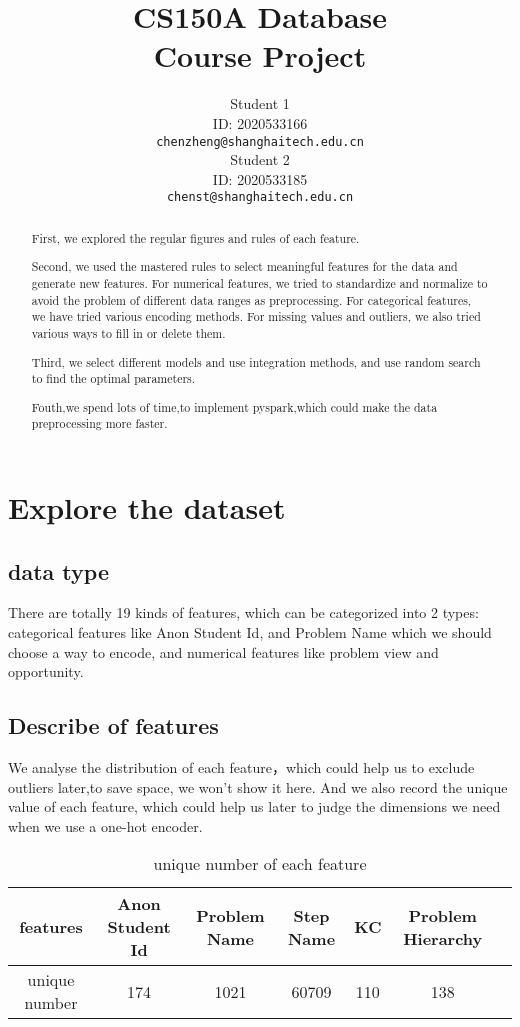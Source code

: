 \documentclass{article}
\title{CS150A Database \\Course Project}
\author{
	Student 1\\
	ID: 2020533166\\
	\texttt{chenzheng@shanghaitech.edu.cn} \\
	\And
	Student 2\\
	ID: 2020533185\\
	\texttt{chenst@shanghaitech.edu.cn}
}
\begin{document}
	
	\maketitle
	
	\begin{abstract}
		
		First, we explored the regular figures and rules of each feature.
		
		Second, we used the mastered rules to select meaningful features for the data and generate new features.
		For numerical features, we tried to standardize and normalize to avoid the problem of different data ranges as preprocessing. For categorical features, we have tried various encoding methods.
		For missing values and outliers, we also tried various ways to fill in or delete them.
		
		Third, we select different models and use integration methods, and use random search to find the optimal parameters.
		
		Fouth,we spend lots of time,to implement pyspark,which could make the data preprocessing more faster.
	\end{abstract}
	
	\section{Explore the dataset}
	\subsection{data type}
	There are totally 19 kinds of features, which can be categorized into 2 types: categorical features like Anon Student Id, and Problem Name which we should choose a way to encode, and numerical features like problem view and opportunity.
	\subsection{Describe of features}
	We analyse the distribution of each feature，which could help us to exclude outliers later,to save space, we won't show it here. And  we also record the unique value of each feature, which could help us later to judge the dimensions we need when we use a one-hot encoder.
	\begin{table}[htb]
		\centering
		\caption{unique number of each feature}
		\label{table1}
		\begin{tabular}{|c|c|c|c|c|c|c|}
			\hline
			{features} & {Anon Student Id} & {Problem Name} & {Step Name} & { KC} &{Problem Hierarchy} \\
			\hline
			
			{unique number} &{174}	&{1021}	&{60709}	&{110}	&{138} \\ 
			\hline
			
		\end{tabular}
		\label{performance of each algorithm}
	\end{table}
\end{document}
